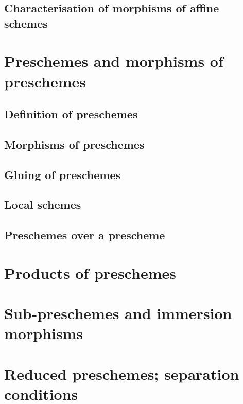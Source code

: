 \documentclass[10pt,oneside]{amsart}
\begin{document}
        \subsection{Characterisation of morphisms of affine schemes}
        

    \section{Preschemes and morphisms of preschemes}

        \subsection{Definition of preschemes}
        

        \subsection{Morphisms of preschemes}
        

        \subsection{Gluing of preschemes}
        

        \subsection{Local schemes}
        

        \subsection{Preschemes over a prescheme}
        

    \section{Products of preschemes}

    \section{Sub-preschemes and immersion morphisms}

    \section{Reduced preschemes; separation conditions}
\end{document}
